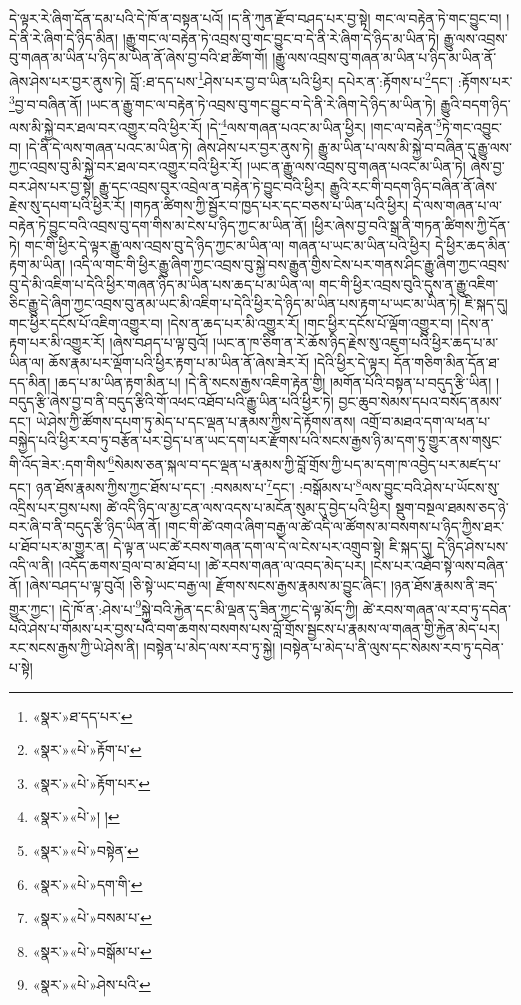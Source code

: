 དེ་ལྟར་རེ་ཞིག་དོན་དམ་པའི་དེ་ཁོ་ན་བསྟན་པའོ། །ད་ནི་ཀུན་རྫོབ་བཤད་པར་བྱ་སྟེ། གང་ལ་བརྟེན་ཏེ་གང་བྱུང་བ། །དེ་ནི་རེ་ཞིག་དེ་ཉིད་མིན། །རྒྱུ་གང་ལ་བརྟེན་ཏེ་འབྲས་བུ་གང་བྱུང་བ་དེ་ནི་རེ་ཞིག་དེ་ཉིད་མ་ཡིན་ཏེ། རྒྱུ་ལས་འབྲས་བུ་གཞན་མ་ཡིན་པ་ཉིད་མ་ཡིན་ནོ་ཞེས་བྱ་བའི་ཐ་ཚིག་གོ། །རྒྱུ་ལས་འབྲས་བུ་གཞན་མ་ཡིན་པ་ཉིད་མ་ཡིན་ནོ་ཞེས་ཤེས་པར་བྱར་ནུས་ཏེ། བློ་:ཐ་དད་པས་\footnote{«སྣར་»ཐ་དད་པར་}ཤེས་པར་བྱ་བ་ཡིན་པའི་ཕྱིར། དཔེར་ན་:རྟོགས་པ་\footnote{«སྣར་»«པེ་»རྟོག་པ་}དང་། :རྟོགས་པར་\footnote{«སྣར་»«པེ་»རྟོག་པར་}བྱ་བ་བཞིན་ནོ། །ཡང་ན་རྒྱུ་གང་ལ་བརྟེན་ཏེ་འབྲས་བུ་གང་བྱུང་བ་དེ་ནི་རེ་ཞིག་དེ་ཉིད་མ་ཡིན་ཏེ། རྒྱུའི་བདག་ཉིད་ལས་མི་སྐྱེ་བར་ཐལ་བར་འགྱུར་བའི་ཕྱིར་རོ། །དེ་\footnote{«སྣར་»«པེ་»། །}ལས་གཞན་པའང་མ་ཡིན་ཕྱིར། །གང་ལ་བརྟེན་\footnote{«སྣར་»«པེ་»བསྟེན་}ཏེ་གང་འབྱུང་བ། །དེ་ནི་དེ་ལས་གཞན་པའང་མ་ཡིན་ཏེ། ཞེས་ཤེས་པར་བྱར་ནུས་ཏེ། རྒྱུ་མ་ཡིན་པ་ལས་མི་སྐྱེ་བ་བཞིན་དུ་རྒྱུ་ལས་ཀྱང་འབྲས་བུ་མི་སྐྱེ་བར་ཐལ་བར་འགྱུར་བའི་ཕྱིར་རོ། །ཡང་ན་རྒྱུ་ལས་འབྲས་བུ་གཞན་པའང་མ་ཡིན་ཏེ། ཞེས་བྱ་བར་ཤེས་པར་བྱ་སྟེ། རྒྱུ་དང་འབྲས་བུར་འབྲེལ་ན་བརྟེན་ཏེ་བྱུང་བའི་ཕྱིར། རྒྱུའི་རང་གི་བདག་ཉིད་བཞིན་ནོ་ཞེས་རྗེས་སུ་དཔག་པའི་ཕྱིར་རོ། །གཏན་ཚིགས་ཀྱི་སྦྱོར་བ་ཁྱད་པར་དང་བཅས་པ་ཡིན་པའི་ཕྱིར། དེ་ལས་གཞན་པ་ལ་བརྟེན་ཏེ་བྱུང་བའི་འབྲས་བུ་དག་གིས་མ་ངེས་པ་ཉིད་ཀྱང་མ་ཡིན་ནོ། །ཕྱིར་ཞེས་བྱ་བའི་སྒྲ་ནི་གཏན་ཚིགས་ཀྱི་དོན་ཏེ། གང་གི་ཕྱིར་དེ་ལྟར་རྒྱུ་ལས་འབྲས་བུ་དེ་ཉིད་ཀྱང་མ་ཡིན་ལ། གཞན་པ་ཡང་མ་ཡིན་པའི་ཕྱིར། དེ་ཕྱིར་ཆད་མིན་རྟག་མ་ཡིན། །འདི་ལ་གང་གི་ཕྱིར་རྒྱུ་ཞིག་ཀྱང་འབྲས་བུ་སྐྱེ་བས་རྒྱུན་གྱིས་ངེས་པར་གནས་ཤིང་རྒྱུ་ཞིག་ཀྱང་འབྲས་བུ་དེ་མི་འཇིག་པ་དེའི་ཕྱིར་གཞན་ཉིད་མ་ཡིན་པས་ཆད་པ་མ་ཡིན་ལ། གང་གི་ཕྱིར་འབྲས་བུའི་དུས་ན་རྒྱུ་འཇིག་ཅིང་རྒྱུ་དེ་ཞིག་ཀྱང་འབྲས་བུ་ནམ་ཡང་མི་འཇིག་པ་དེའི་ཕྱིར་དེ་ཉིད་མ་ཡིན་པས་རྟག་པ་ཡང་མ་ཡིན་ཏེ། ཇི་སྐད་དུ། གང་ཕྱིར་དངོས་པོ་འཇིག་འགྱུར་བ། །དེས་ན་ཆད་པར་མི་འགྱུར་རོ། །གང་ཕྱིར་དངོས་པོ་ལྡོག་འགྱུར་བ། །དེས་ན་རྟག་པར་མི་འགྱུར་རོ། །ཞེས་བཤད་པ་ལྟ་བུའོ། །ཡང་ན་ཁ་ཅིག་ན་རེ་ཆོས་ཉིད་རྗེས་སུ་འཇུག་པའི་ཕྱིར་ཆད་པ་མ་ཡིན་ལ། ཆོས་རྣམ་པར་ལྡོག་པའི་ཕྱིར་རྟག་པ་མ་ཡིན་ནོ་ཞེས་ཟེར་རོ། །དེའི་ཕྱིར་དེ་ལྟར། དོན་གཅིག་མིན་དོན་ཐ་དད་མིན། །ཆད་པ་མ་ཡིན་རྟག་མིན་པ། །དེ་ནི་སངས་རྒྱས་འཇིག་རྟེན་གྱི། །མགོན་པོའི་བསྟན་པ་བདུད་རྩི་ཡིན། །བདུད་རྩི་ཞེས་བྱ་བ་ནི་བདུད་རྩིའི་གོ་འཕང་འཐོབ་པའི་རྒྱུ་ཡིན་པའི་ཕྱིར་ཏེ། བྱང་ཆུབ་སེམས་དཔའ་བསོད་ནམས་དང་། ཡེ་ཤེས་ཀྱི་ཚོགས་དཔག་ཏུ་མེད་པ་དང་ལྡན་པ་རྣམས་ཀྱིས་དེ་རྟོགས་ནས། འགྲོ་བ་མཐའ་དག་ལ་ཕན་པ་བསྐྱེད་པའི་ཕྱིར་རབ་ཏུ་བརྩོན་པར་བྱེད་པ་ན་ཡང་དག་པར་རྫོགས་པའི་སངས་རྒྱས་ཉི་མ་དག་ཏུ་གྱུར་ནས་གསུང་གི་འོད་ཟེར་:དག་གིས་\footnote{«སྣར་»«པེ་»དག་གི་}སེམས་ཅན་སྐལ་བ་དང་ལྡན་པ་རྣམས་ཀྱི་བློ་གྲོས་ཀྱི་པད་མ་དག་ཁ་འབྱེད་པར་མཛད་པ་དང་། ཉན་ཐོས་རྣམས་ཀྱིས་ཀྱང་ཐོས་པ་དང་། :བསམས་པ་\footnote{«སྣར་»«པེ་»བསམ་པ་}དང་། :བསྒོམས་པ་\footnote{«སྣར་»«པེ་»བསྒོམ་པ་}ལས་བྱུང་བའི་ཤེས་པ་ཡོངས་སུ་འདྲིས་པར་བྱས་པས། ཚེ་འདི་ཉིད་ལ་མྱ་ངན་ལས་འདས་པ་མངོན་སུམ་དུ་བྱེད་པའི་ཕྱིར། སྡུག་བསྔལ་ཐམས་ཅད་ཉེ་བར་ཞི་བ་ནི་བདུད་རྩི་ཉིད་ཡིན་ནོ། །གང་གི་ཚེ་འགའ་ཞིག་བརྒྱ་ལ་ཚེ་འདི་ལ་ཚོགས་མ་བསགས་པ་ཉིད་ཀྱིས་ཐར་པ་ཐོབ་པར་མ་གྱུར་ན། དེ་ལྟ་ན་ཡང་ཚེ་རབས་གཞན་དག་ལ་དེ་ལ་ངེས་པར་འགྲུབ་སྟེ། ཇི་སྐད་དུ། དེ་ཉིད་ཤེས་པས་འདི་ལ་ནི། །འདོད་ཆགས་བྲལ་བ་མ་ཐོབ་པ། །ཚེ་རབས་གཞན་ལ་འབད་མེད་པར། །ངེས་པར་འཐོབ་སྟེ་ལས་བཞིན་ནོ། །ཞེས་བཤད་པ་ལྟ་བུའོ། །ཅི་སྟེ་ཡང་བརྒྱ་ལ། རྫོགས་སངས་རྒྱས་རྣམས་མ་བྱུང་ཞིང་། །ཉན་ཐོས་རྣམས་ནི་ཟད་གྱུར་ཀྱང་། །དེ་ཁོ་ན་:ཤེས་པ་\footnote{«སྣར་»«པེ་»ཤེས་པའི་}སྐྱེ་བའི་རྐྱེན་དང་མི་ལྡན་དུ་ཟིན་ཀྱང་དེ་ལྟ་མོད་ཀྱི། ཚེ་རབས་གཞན་ལ་རབ་ཏུ་དབེན་པའི་ཤེས་པ་གོམས་པར་བྱས་པའི་བག་ཆགས་བསགས་པས་བློ་གྲོས་སྦྱངས་པ་རྣམས་ལ་གཞན་གྱི་རྐྱེན་མེད་པར། རང་སངས་རྒྱས་ཀྱི་ཡེ་ཤེས་ནི། །བསྟེན་པ་མེད་ལས་རབ་ཏུ་སྐྱེ། །བསྟེན་པ་མེད་པ་ནི་ལུས་དང་སེམས་རབ་ཏུ་དབེན་པ་སྟེ། 